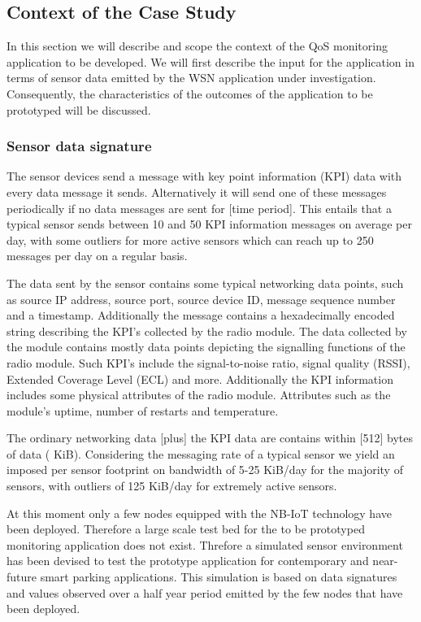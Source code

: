 \subsection{Context of the Case Study}
In this section we will describe and scope the context of the QoS monitoring application to be developed. We will first describe the input for the application in terms of sensor data emitted by the WSN application under investigation. Consequently, the characteristics of the outcomes of the application to be prototyped will be discussed. 

\subsubsection{Sensor data signature}
The sensor devices send a message with key point information (KPI) data with every data message it sends. Alternatively it will send one of these messages periodically if no data messages are sent for [time period]. This entails that a typical sensor sends between 10 and 50 KPI information messages on average per day, with some outliers for more active sensors which can reach up to 250 messages per day on a regular basis.

The data sent by the sensor contains some typical networking data points, such as source IP address, source port, source device ID, message sequence number and a timestamp. Additionally the message contains a hexadecimally encoded string describing the KPI's collected by the \ublox radio module. The data collected by the \ublox module contains mostly data points depicting the signalling functions of the radio module. Such KPI's include the signal-to-noise ratio, signal quality (RSSI), Extended Coverage Level (ECL)  and more. Additionally the KPI information includes some physical attributes of the radio module. Attributes such as the module's uptime, number of restarts and temperature. 

The ordinary networking data [plus] the \ublox KPI data are contains within [512] bytes of data ( KiB). Considering the messaging rate of a typical sensor we yield an imposed per sensor footprint on bandwidth of 5-25 KiB/day for the majority of sensors, with outliers of 125 KiB/day for extremely active sensors.

At this moment only a few nodes equipped with the NB-IoT technology have been deployed. Therefore a large scale test bed for the to be prototyped monitoring application does not exist. Threfore a simulated sensor environment has been devised to test the prototype application for contemporary and near-future smart parking applications. This simulation is based on data signatures and values observed over a half year period emitted by the few nodes that have been deployed.

